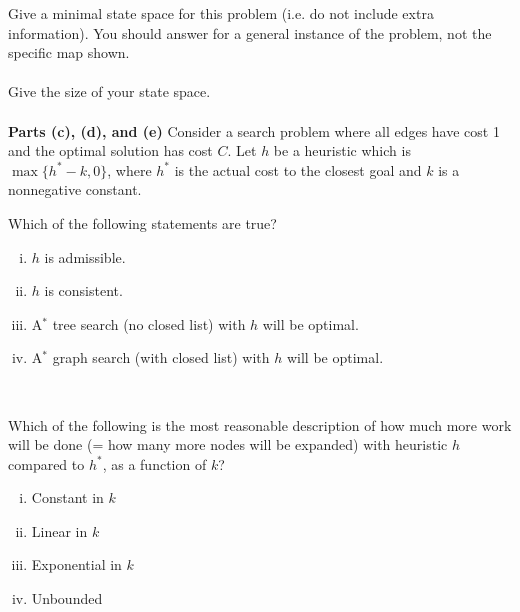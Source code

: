 \begin{enumerate}

 Give a minimal state space for this problem (i.e. do not include extra information). You should answer for a general instance of the problem, not the specific map shown. \\

\fbox{\begin{minipage}[t][4cm][t]{13cm} \AnswerOneA \end{minipage}} \\

 Give the size of your state space. \\

\fbox{\begin{minipage}[t][4cm][t]{13cm} \AnswerOneB \end{minipage}} \\

\newpage
\textbf{Parts (c), (d), and (e)} Consider a search problem where all edges have cost 1
and the optimal solution has cost $C$.  Let $h$ be a heuristic which is $\max
\{h^* - k, 0\}$, where $h^*$ is the actual cost to the closest goal and $k$ is a
nonnegative constant.

 Which of the following statements are true?\\
\begin{enumerate}[(i)]
\item $h$ is admissible. 

\item $h$ is consistent.

\item A$^*$ tree search (no closed list) with $h$ will be optimal.

\item A$^*$ graph search (with closed list) with $h$ will be optimal.

\fbox{\begin{minipage}[t][2.5cm][t]{13cm} \AnswerOneC \end{minipage}}\\

\end{enumerate}

 Which of the following is the most reasonable description of how much
more work will be done (= how many more nodes will be expanded) with heuristic
$h$ compared to $h^*$, as a function of $k$?
\begin{enumerate}[(i)]
\item Constant in $k$\\
\item Linear in $k$\\
\item Exponential in $k$\\
\item Unbounded\\


\end{enumerate}
\end{enumerate}
